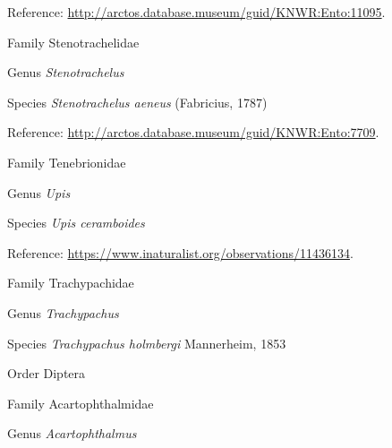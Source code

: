 \documentclass[9pt, article]{memoir}
\begin{document}
\begin{multicols}{2}
\vspace{6pt}Reference: 
\url{http://arctos.database.museum/guid/KNWR:Ento:11095}.

\vspace{6pt}\noindent\hspace{24pt}Family Stenotrachelidae


\vspace{6pt}\noindent\hspace{30pt}Genus \textit{Stenotrachelus}


\vspace{6pt}\noindent\hspace{36pt}Species \textit{Stenotrachelus aeneus} (Fabricius, 1787)


\vspace{6pt}Reference: 
\url{http://arctos.database.museum/guid/KNWR:Ento:7709}.

\vspace{6pt}\noindent\hspace{24pt}Family Tenebrionidae


\vspace{6pt}\noindent\hspace{30pt}Genus \textit{Upis}


\vspace{6pt}\noindent\hspace{36pt}Species \textit{Upis ceramboides}


\vspace{6pt}Reference: 
\url{https://www.inaturalist.org/observations/11436134}.

\vspace{6pt}\noindent\hspace{24pt}Family Trachypachidae


\vspace{6pt}\noindent\hspace{30pt}Genus \textit{Trachypachus}


\vspace{6pt}\noindent\hspace{36pt}Species \textit{Trachypachus holmbergi} Mannerheim, 1853


\vspace{6pt}\noindent\hspace{18pt}Order Diptera


\vspace{6pt}\noindent\hspace{24pt}Family Acartophthalmidae


\vspace{6pt}\noindent\hspace{30pt}Genus \textit{Acartophthalmus}



\end{multicols}
\end{document}
